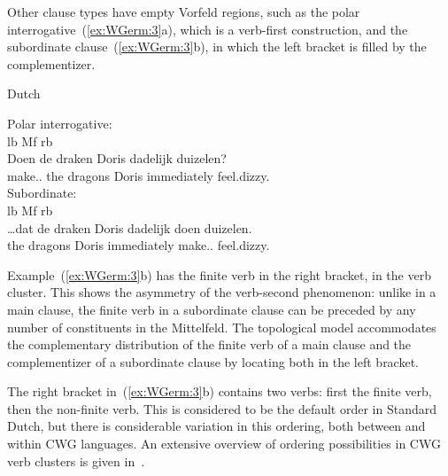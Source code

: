 \documentclass[output=paper,hidelinks]{langscibook}
\begin{document}
Other clause types have empty Vorfeld regions, such as the polar
interrogative~(\ref{ex:WGerm:3}a), which is a verb-first construction, and the subordinate
clause~(\ref{ex:WGerm:3}b), in which the left bracket is filled by the complementizer.

\begin{exe}
  \ex\label{ex:WGerm:3} Dutch 
  \begin{xlist}
    \ex  Polar interrogative:\\
         {\glll%
           lb\streep{1.25em}      Mf\streep{9.5em} {} {} {}  rb\streep{2.5em}\\    
           Doen de draken {Doris} dadelijk duizelen?\\
           make.\PRS.\PL{} the dragons Doris immediately feel.dizzy.\INF{}\\}
    \ex Subordinate:\\
        {\glll%
          \phantom{\ldots}lb\streep{.375em}  Mf\streep{9.5em} {} {} {}  rb\streep{7.5em}\\
          \ldots{}dat de draken Doris dadelijk doen duizelen.\\
         \phantom{\ldots}\COMP{} the dragons Doris immediately make.\PRS.\PL{} feel.dizzy.\INF{}\\}
  \end{xlist}
\end{exe}
%
Example~(\ref{ex:WGerm:3}b) has the finite verb in the right bracket, in the verb
cluster. This shows the asymmetry of the verb-second phenomenon:
unlike in a main clause, the finite verb in a subordinate clause can
be preceded by any number of constituents in the Mittelfeld. The
topological model accommodates the complementary distribution of the
finite verb of a main clause and the complementizer of a subordinate
clause by locating both in the left bracket.

The right bracket in~(\ref{ex:WGerm:3}b) contains two verbs: first the finite verb,
then the non-finite verb. This is considered to be the default
order in Standard Dutch, but there is considerable variation in this
ordering, both between and within CWG languages. An extensive overview
of ordering possibilities in CWG verb clusters is given
in~\citet{wurmbrand:2004}.
\end{document}
